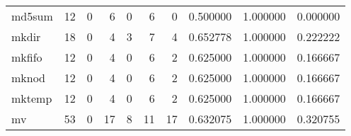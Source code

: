 \begin{longtable}{lrrrrrrrrr}
md5sum    &                                       12 &                                                  0 &                                                  6 &                                                  0 &                                                  6 &                                                  0 &                                           0.500000 &                               1.000000 &                             0.000000 \\
mkdir     &                                       18 &                                                  0 &                                                  4 &                                                  3 &                                                  7 &                                                  4 &                                           0.652778 &                               1.000000 &                             0.222222 \\
mkfifo    &                                       12 &                                                  0 &                                                  4 &                                                  0 &                                                  6 &                                                  2 &                                           0.625000 &                               1.000000 &                             0.166667 \\
mknod     &                                       12 &                                                  0 &                                                  4 &                                                  0 &                                                  6 &                                                  2 &                                           0.625000 &                               1.000000 &                             0.166667 \\
mktemp    &                                       12 &                                                  0 &                                                  4 &                                                  0 &                                                  6 &                                                  2 &                                           0.625000 &                               1.000000 &                             0.166667 \\
mv        &                                       53 &                                                  0 &                                                 17 &                                                  8 &                                                 11 &                                                 17 &                                           0.632075 &                               1.000000 &                             0.320755 \\

\end{longtable}
